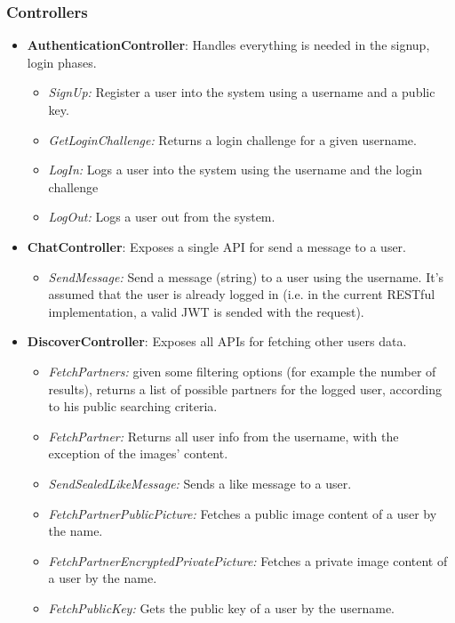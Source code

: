 \documentclass{article}
\begin{document}
\subsubsection{Controllers}
\label{sec:controllers}
\begin{itemize}
	\item \textbf{AuthenticationController}: Handles everything is needed in the signup, login phases.
	    \begin{itemize}
	        \item \textit{ SignUp:} Register a user into the system using a username and a public key.
	        \item \textit{ GetLoginChallenge:} Returns a login challenge for a given username.
	        \item \textit{ LogIn:} Logs a user into the system using the username and the login challenge
	        \item \textit{ LogOut:} Logs a user out from the system.
	    \end{itemize}
	\item \textbf{ChatController}: Exposes a single API for send a message to a user.
		\begin{itemize}
	        \item \textit{ SendMessage:} Send a message (string) to a user using the username. It's assumed that the user is already logged in (i.e. in the current RESTful implementation, a valid JWT is sended with the request).
	    \end{itemize}
	\item \textbf{DiscoverController}: Exposes all APIs for fetching other users data.
		\begin{itemize}
	        \item \textit{ FetchPartners:} given some filtering options (for example the number of results), returns a list of possible partners for the logged user, according to his public searching criteria.
	        \item \textit{ FetchPartner:} Returns all user info from the username, with the exception of the images' content.
	        \item \textit{ SendSealedLikeMessage:} Sends a like message to a user.
	        \item \textit{ FetchPartnerPublicPicture:} Fetches a public image content of a user by the name.
	        \item \textit{ FetchPartnerEncryptedPrivatePicture:} Fetches a private image content of a user by the name.
	        \item \textit{ FetchPublicKey:} Gets the public key of a user by the username.

\end{itemize}
\end{itemize}
\end{document}
